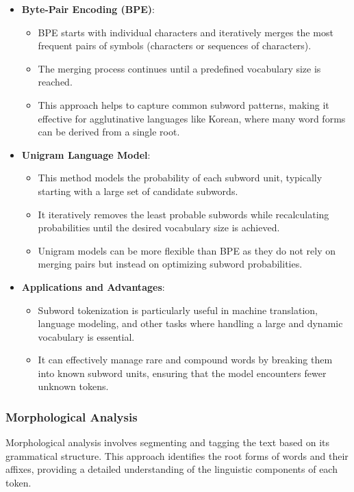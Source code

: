 \documentclass{article}
\begin{document}
\begin{itemize}
\item \textbf{Byte-Pair Encoding (BPE)}:
    \begin{itemize}
        \item BPE starts with individual characters and iteratively merges the most frequent pairs of symbols (characters or sequences of characters).
        \item The merging process continues until a predefined vocabulary size is reached.
        \item This approach helps to capture common subword patterns, making it effective for agglutinative languages like Korean, where many word forms can be derived from a single root.
    \end{itemize}

\item \textbf{Unigram Language Model}:
    \begin{itemize}
        \item This method models the probability of each subword unit, typically starting with a large set of candidate subwords.
        \item It iteratively removes the least probable subwords while recalculating probabilities until the desired vocabulary size is achieved.
        \item Unigram models can be more flexible than BPE as they do not rely on merging pairs but instead on optimizing subword probabilities.
   \end{itemize}

\item \textbf{Applications and Advantages}:
    \begin{itemize}
        \item Subword tokenization is particularly useful in machine translation, language modeling, and other tasks where handling a large and dynamic vocabulary is essential.
        \item It can effectively manage rare and compound words by breaking them into known subword units, ensuring that the model encounters fewer unknown tokens.
    \end{itemize}
\end{itemize}

\subsubsection{Morphological Analysis}

Morphological analysis involves segmenting and tagging the text based on its grammatical structure. This approach identifies the root forms of words and their affixes, providing a detailed understanding of the linguistic components of each token.
\end{document}
